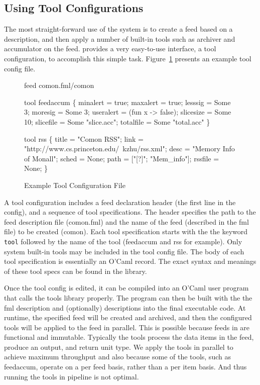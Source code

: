 \subsection{Using Tool Configurations}
\label{sec:tools}

The most straight-forward use of the \padsd{} system is to create a feed based on a \padsd{}
description, and then apply a number of built-in tools such as archiver and
accumulator on the feed. \padsd{} provides a very easy-to-use interface, a tool configuration, 
to accomplish this simple task. 
Figure~\ref{fig:toolconfigs} presents an example tool config file.

\begin{figure}[tb]
\centering
\begin{codebox}
feed comon.fml/comon

tool feedaccum
\{
  minalert  = true;
  maxalert  = true;
  lesssig   = Some 3;
  moresig   = Some 3;
  useralert = (fun x -> false);
  slicesize = Some 10;
  slicefile = Some "slice.acc";
  totalfile = Some "total.acc"
\}

tool rss
\{
  title = "Comon RSS";
  link  = "http://www.cs.princeton.edu/~kzhu/rss.xml";
  desc  = "Memory Info of Monall";
  sched = None; 
  path  = ["[?]"; "Mem_info"];
  rssfile = None; 
\}
\end{codebox}
\caption{Example Tool Configuration File}
\label{fig:toolconfigs}
\end{figure}

A tool configuration includes a feed declaration header (the first line in the config),
and a sequence of tool specifications. The header specifies the path to the 
feed description file (comon.fml) and the name of the feed (described in the fml file) 
to be created (comon).
Each tool specification starts with the the keyword {\tt tool} followed by the
name of the tool (feedaccum and rss for example). Only system built-in tools may be 
included in the tool config file. The body of each tool specification is essentially
an O'Caml record. The exact syntax and meanings of these tool specs can be found in
the \padsd{} library. 

Once the tool config is edited, it can be compiled into an O'Caml user program
that calls the \padsd{} tools library properly. The program can then be built with the the
fml description and (optionally) \padsml{} descriptions into the final executable
code. At runtime, the specified feed will be created and archived, and then the
configured tools will be applied to the feed in parallel. This is possible because feeds in
\padsd{} are functional and immutable. Typically the tools process the data items
in the feed, produce an output, and return unit type. We apply the tools in parallel to
achieve maximum throughput and also because some of the tools, such as feedaccum,
operate on a per feed basis, rather than a per item basis. And thus running the tools
in pipeline is not optimal.

